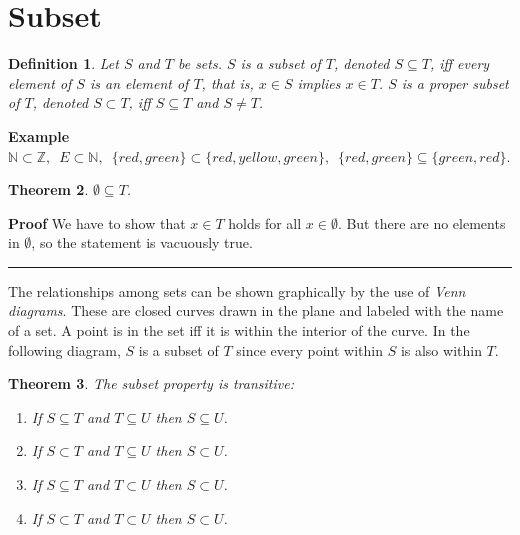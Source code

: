 \documentclass[12pt,a4paper]{article}
\newtheorem{theorem}{Theorem}
\newtheorem{definition}[theorem]{Definition}
\newcommand*{\qed}{\hfill\rule[-2pt]{4pt}{10pt}}
\newcommand*{\comma}{,\:}
\newenvironment{example}{\textbf{Example}}{}
\newenvironment{proof}{\textbf{Proof}}{\qed}
\begin{document}
\section{Subset}

\begin{definition}
Let $S$ and $T$ be sets. $S$ is a \emph{subset} of
$T$, denoted $S\subseteq T$, iff every element of
$S$ is an element of $T$, that is, $x\in S$ implies $x \in T$. $S$ is a
\emph{proper subset} of $T$, denoted $S\subset
T$, iff $S\subseteq T$ and $S\neq T$.
\end{definition}

\begin{example}
$\mathbb{N}\subset \mathbb{Z}\comma\; E \subset \mathbb{N}\comma\; \{\mathit{red},\mathit{green}\}\subset \{\mathit{red}, \mathit{yellow}, \mathit{green}\}\comma\; \{\mathit{red},\mathit{green}\}\subseteq \{\mathit{green}, \mathit{red}\}$.
\end{example}

\begin{theorem} $\emptyset \subseteq T$.
\end{theorem}
\begin{proof}
We have to show that $x \in T$ holds for all $x\in \emptyset$. But there are no elements in $\emptyset$, so the statement is vacuously true.
\end{proof}

The relationships among sets can be shown graphically by the use
of \emph{Venn diagrams}. These are closed curves
drawn in the plane and labeled with the name of a set. A point is in the
set iff it is within the interior of the curve. In the following diagram, $S$ is a subset of $T$ since every point within $S$ is also within $T$.

\begin{center}
\end{center}

\begin{theorem}The subset property is transitive:

\begin{enumerate}
\item If $S\subseteq T$ and $T\subseteq U$ then $S\subseteq U$.
\item If $S\subset T$ and $T\subseteq U$ then $S\subset U$.
\item If $S\subseteq T$ and $T\subset U$ then $S\subset U$.
\item If $S\subset T$ and $T\subset U$ then $S\subset U$.
\end{enumerate}
\end{theorem}
\end{document}
